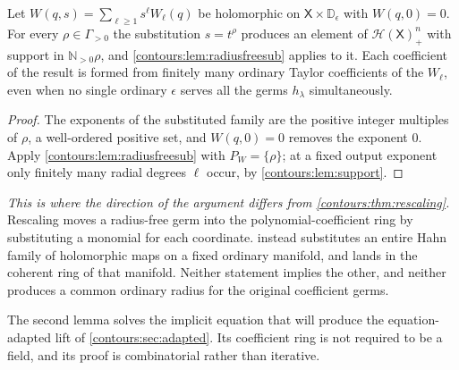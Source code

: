 \documentclass[11pt,letterpaper]{article}
\theoremstyle{definition}
\theoremstyle{remark}
\newcommand{\N}{\mathbb N}\newcommand{\Z}{\mathbb Z}\newcommand{\DD}{\mathbb D}
\newcommand{\HH}{\mathcal H}\newcommand{\A}{\mathscr A}\newcommand{\OO}{\mathcal O}
\numberwithin{equation}{section}
\begin{document}
\begin{corollary}
\label{contours:cor:radialeval}
Let $W(q,s)=\sum_{\ell\ge1}s^\ell W_\ell(q)$ be holomorphic on
$\mathsf X\times\DD_\epsilon$ with $W(q,0)=0$. For every $\rho\in\Gamma_{>0}$
the substitution $s=t^\rho$ produces an element of $\HH(\mathsf X)_+^n$ with
support in $\N_{>0}\rho$, and \cref{contours:lem:radiusfreesub} applies to it.
Each coefficient of the result is formed from finitely many ordinary Taylor
coefficients of the $W_\ell$, even when no single ordinary $\epsilon$ serves
all the germs $h_\lambda$ simultaneously.
\end{corollary}
\begin{proof}
The exponents of the substituted family are the positive integer multiples of
$\rho$, a well-ordered positive set, and $W(q,0)=0$ removes the exponent $0$.
Apply \cref{contours:lem:radiusfreesub} with $P_W=\{\rho\}$; at a fixed output
exponent only finitely many radial degrees $\ell$ occur, by
\cref{contours:lem:support}.
\end{proof}

\emph{This is where the direction of the argument differs from
\cref{contours:thm:rescaling}.} Rescaling moves a radius-free germ into the
polynomial-coefficient ring by substituting a monomial for each coordinate.
 instead substitutes an entire Hahn family of
holomorphic maps on a fixed ordinary manifold, and lands in the coherent ring of
that manifold. Neither statement implies the other, and neither produces a
common ordinary radius for the original coefficient germs.

The second lemma solves the implicit equation that will produce the
equation-adapted lift of \cref{contours:sec:adapted}. Its coefficient ring is
not required to be a field, and its proof is combinatorial rather than
iterative.
\end{document}
